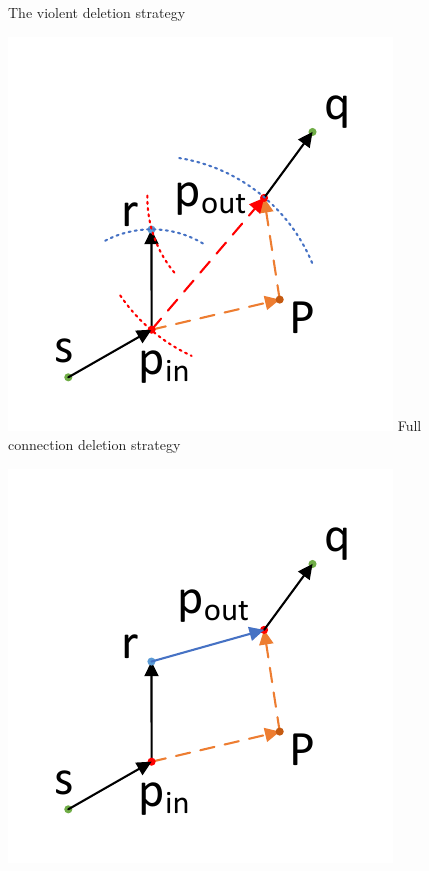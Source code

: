 \begin{figure}[h]
\begin{minipage}{0.49\linewidth}
		The violent deletion strategy
	\end{minipage}
	\begin{minipage}{0.49\linewidth}
		\centering
		\vspace{3pt}
		\includegraphics[width=\textwidth]{fig/Example/MSNET_delete_policyB.pdf}
		Full connection deletion strategy
	\end{minipage}
	\begin{minipage}{0.49\linewidth}
		\centering
		\vspace{3pt}
		\includegraphics[width=\textwidth]{fig/Example/MSNET_delete_policyC.pdf}

\end{minipage}
\end{figure}
